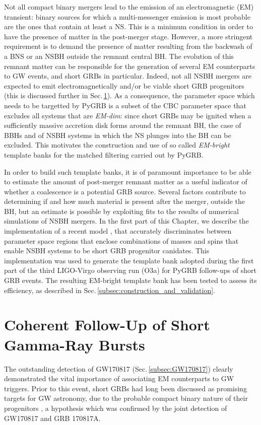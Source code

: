 \documentclass[binding=0.6cm, LaM]{sapthesis}
\begin{document}
	Not all compact binary mergers lead to the emission of an electromagnetic (EM) transient:
        binary sources for which a multi-messenger emission is most probable are the ones that contain at least a NS.
        This is a minimum condition in order to have the presence of matter in the post-merger stage.
        However, a more stringent requirement is to demand
        the presence of matter resulting from the backwash of a BNS or an NSBH
        outside the remnant central BH.
        The evolution of this remnant matter can be responsible for the generation of several EM counterparts to GW events, and short GRBs in particular.
        Indeed, not all NSBH mergers are expected to emit electromagnetically and/or be viable short GRB progenitors (this is discussed further in Sec.\,\ref{sec:grbfollowup}).
        As a consequence, the parameter space which needs to be targetted by {\ttfamily PyGRB}
        is a subset of the CBC parameter space that excludes all systems that are \textit{EM-dim}:
        since short GRBs may be ignited when a sufficiently massive accretion disk forms around the remnant BH,
        the case of BBHs and of NSBH systems in which the NS plunges into the BH can be excluded.
        This motivates the construction and use of
        so called \textit{EM-bright} template banks for the matched filtering carried out by {\ttfamily PyGRB}.

        In order to build such template banks,
        it is of paramount importance to be able to estimate the amount of post-merger remnant matter as a useful indicator of
        whether a coalescence is a potential GRB source.
        Several factors contribute to determining if and how much material is present after the merger, outside the BH,
        but an estimate is possible by exploiting fits to the results of
        numerical simulations of NSBH mergers.
        In the first part of this Chapter, we describe the implementation of a recent model \cite{54}, that accurately discriminates between parameter space
        regions that enclose combinations of masses and spins that enable NSBH systems to be short GRB progenitor canidates.
        This implementation was used to generate the template bank adopted during the first part of the third LIGO-Virgo observing run (O3a) for {\ttfamily PyGRB} follow-ups of short GRB events.
        The resulting EM-bright template bank has been tested to assess its efficiency, as described in Sec.\,\ref{subsec:construction_and_validation}.
       
\section{Coherent Follow-Up of Short Gamma-Ray Bursts}
\label{sec:grbfollowup}
	The outstanding detection of GW170817 (Sec.\,\ref{subsec:GW170817}) 
        clearly demonstrated the vital importance of associating EM counterparts to GW triggers.
        Prior to this event, short GRBs had long been discussed as promising targets for GW astronomy,
        due to the probable compact binary nature of their progenitors \cite{154},
        a hypothesis which was confirmed by the joint detection of GW170817 and GRB 170817A.	
\end{document}

